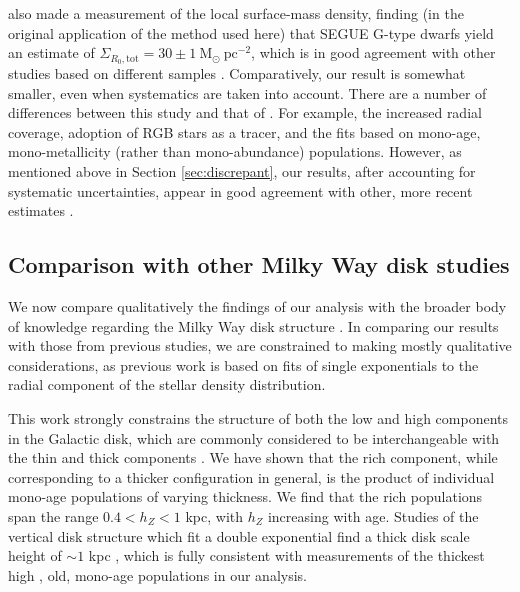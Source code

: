 \citet{2012ApJ...751..131B} also made a measurement of the local surface-mass density, finding (in the original application of the method used here) that SEGUE G-type dwarfs yield an estimate of $\Sigma_{R_0,\text{tot}} = 30 \pm 1\ \mathrm{M_{\odot}\ pc^{-2}}$, which is in good agreement with other studies based on different samples \citep[e.g.][]{2006MNRAS.372.1149F,2015ApJ...814...13M}.  Comparatively, our result is somewhat smaller, even when systematics are taken into account. There are a number of differences between this study and that of \citet{2012ApJ...751..131B}. For example, the increased radial coverage, adoption of RGB stars as a tracer, and the fits based on mono-age, mono-metallicity (rather than mono-abundance) populations. However, as mentioned above in Section \ref{sec:discrepant}, our results, after accounting for systematic uncertainties, appear in good agreement with other, more recent estimates \citep{2015ApJ...814...13M}. 

 \subsection{Comparison with other Milky Way disk studies}
We now compare qualitatively the findings of our analysis with the broader body of knowledge regarding the Milky Way disk structure \citep[see, e.g.][for recent reviews]{2013A&ARv..21...61R,2016ARA&A..54..529B} . In comparing our results with those from previous studies, we are constrained to making mostly qualitative considerations, as previous work is based on fits of single exponentials to the radial component of the stellar density distribution.

This work strongly constrains the structure of both the low and high \afe{} components in the Galactic disk, which are commonly considered to be interchangeable with the thin and thick components \citep[as asserted by, e.g.][]{2004A&A...415..155B,2012A&A...545A..32A,1998A&A...338..161F}. We have shown that the \afe{} rich component, while corresponding to a thicker configuration in general, is the product of individual mono-age populations of varying thickness. We find that the \afe{} rich populations span the range  $ 0.4 < h_Z < 1$ kpc, with $h_Z$ increasing with age. Studies of the vertical disk structure which fit a double exponential find a thick disk scale height of $\sim 1$ kpc  \citep[e.g.][]{1983MNRAS.202.1025G,2008ApJ...673..864J}, which is fully consistent with measurements of the thickest high \afe{}, old, mono-age populations in our analysis. 

